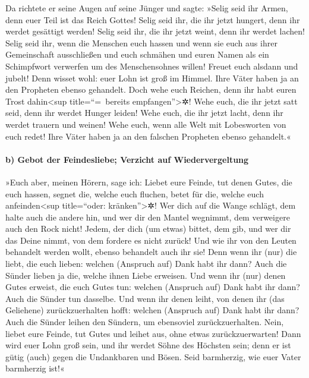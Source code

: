  Da richtete er seine Augen auf seine Jünger und sagte:
»Selig seid ihr Armen, denn euer Teil ist das Reich Gottes!
 Selig seid ihr, die ihr jetzt hungert, denn ihr werdet
gesättigt werden! Selig seid ihr, die ihr jetzt weint, denn ihr werdet
lachen!  Selig seid ihr, wenn die Menschen euch hassen
und wenn sie euch aus ihrer Gemeinschaft ausschließen und euch schmähen
und euren Namen als ein Schimpfwort verwerfen um des Menschensohnes
willen!  Freuet euch alsdann und jubelt! Denn wisset
wohl: euer Lohn ist groß im Himmel. Ihre Väter haben ja an den Propheten
ebenso gehandelt.  Doch wehe euch Reichen, denn ihr habt
euren Trost dahin\textless sup title=``=~bereits
empfangen''\textgreater✲!  Wehe euch, die ihr jetzt satt
seid, denn ihr werdet Hunger leiden! Wehe euch, die ihr jetzt lacht,
denn ihr werdet trauern und weinen!  Wehe euch, wenn alle
Welt mit Lobesworten von euch redet! Ihre Väter haben ja an den falschen
Propheten ebenso gehandelt.«

\hypertarget{b-gebot-der-feindesliebe-verzicht-auf-wiedervergeltung}{%
\paragraph{b) Gebot der Feindesliebe; Verzicht auf
Wiedervergeltung}\label{b-gebot-der-feindesliebe-verzicht-auf-wiedervergeltung}}

 »Euch aber, meinen Hörern, sage ich: Liebet eure Feinde,
tut denen Gutes, die euch hassen,  segnet die, welche
euch fluchen, betet für die, welche euch anfeinden\textless sup
title=``oder: kränken''\textgreater✲!  Wer dich auf die
Wange schlägt, dem halte auch die andere hin, und wer dir den Mantel
wegnimmt, dem verweigere auch den Rock nicht!  Jedem, der
dich (um etwas) bittet, dem gib, und wer dir das Deine nimmt, von dem
fordere es nicht zurück!  Und wie ihr von den Leuten
behandelt werden wollt, ebenso behandelt auch ihr sie! 
Denn wenn ihr (nur) die liebt, die euch lieben: welchen (Anspruch auf)
Dank habt ihr dann? Auch die Sünder lieben ja die, welche ihnen Liebe
erweisen.  Und wenn ihr (nur) denen Gutes erweist, die
euch Gutes tun: welchen (Anspruch auf) Dank habt ihr dann? Auch die
Sünder tun dasselbe.  Und wenn ihr denen leiht, von denen
ihr (das Geliehene) zurückzuerhalten hofft: welchen (Anspruch auf) Dank
habt ihr dann? Auch die Sünder leihen den Sündern, um ebensoviel
zurückzuerhalten.  Nein, liebet eure Feinde, tut Gutes
und leihet aus, ohne etwas zurückzuerwarten! Dann wird euer Lohn groß
sein, und ihr werdet Söhne des Höchsten sein; denn er ist gütig (auch)
gegen die Undankbaren und Bösen.  Seid barmherzig, wie
euer Vater barmherzig ist!«

